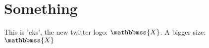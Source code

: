\documentclass{article}
\begin{document}
\section*{Something}

This is 'eks', the new twitter logo: $\mathbbmss{X}$. 
A bigger size: \huge $\mathbbmss{X}$
\end{document}
